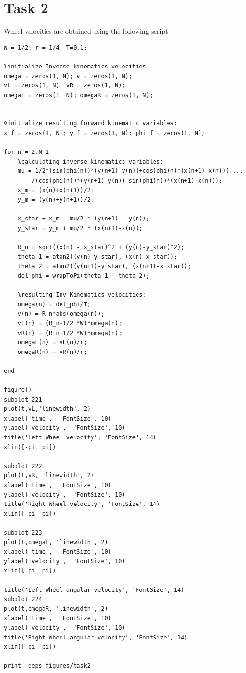 \documentclass[12pt,letterpaper]{article}
\begin{document}
\section*{Task 2}
Wheel velocities are obtained using the following script: 
\begin{lstlisting}
W = 1/2; r = 1/4; T=0.1; 

%initialize Inverse kinematics velocities
omega = zeros(1, N); v = zeros(1, N); 
vL = zeros(1, N); vR = zeros(1, N); 
omegaL = zeros(1, N); omegaR = zeros(1, N); 


%initialize resulting forward kinematic variables: 
x_f = zeros(1, N); y_f = zeros(1, N); phi_f = zeros(1, N); 

for n = 2:N-1
    %calculating inverse kinematics variables: 
    mu = 1/2*(sin(phi(n))*(y(n+1)-y(n))+cos(phi(n)*(x(n+1)-x(n))))...
        /(cos(phi(n))*(y(n+1)-y(n))-sin(phi(n))*(x(n+1)-x(n))); 
    x_m = (x(n)+x(n+1))/2; 
    y_m = (y(n)+y(n+1))/2; 
    
    x_star = x_m - mu/2 * (y(n+1) - y(n)); 
    y_star = y_m + mu/2 * (x(n+1)-x(n)); 
    
    R_n = sqrt((x(n) - x_star)^2 + (y(n)-y_star)^2); 
    theta_1 = atan2((y(n)-y_star), (x(n)-x_star)); 
    theta_2 = atan2((y(n+1)-y_star), (x(n+1)-x_star)); 
    del_phi = wrapToPi(theta_1 - theta_2); 
    
    %resulting Inv-Kinematics velocities: 
    omega(n) = del_phi/T; 
    v(n) = R_n*abs(omega(n));  
    vL(n) = (R_n-1/2 *W)*omega(n); 
    vR(n) = (R_n+1/2 *W)*omega(n); 
    omegaL(n) = vL(n)/r; 
    omegaR(n) = vR(n)/r; 

end

figure()
subplot 221
plot(t,vL,'linewidth', 2)
xlabel('time',  'FontSize', 10)
ylabel('velocity',  'FontSize', 10)
title('Left Wheel velocity', 'FontSize', 14)
xlim([-pi  pi])

subplot 222
plot(t,vR, 'linewidth', 2)
xlabel('time',  'FontSize', 10)
ylabel('velocity',  'FontSize', 10)
title('Right Wheel velocity', 'FontSize', 14)
xlim([-pi  pi])

subplot 223
plot(t,omegaL, 'linewidth', 2)
xlabel('time',  'FontSize', 10)
ylabel('velocity',  'FontSize', 10)
xlim([-pi  pi])

title('Left Wheel angular velocity', 'FontSize', 14)
subplot 224
plot(t,omegaR, 'linewidth', 2)
xlabel('time',  'FontSize', 10)
ylabel('velocity',  'FontSize', 10)
title('Right Wheel angular velocity', 'FontSize', 14)
xlim([-pi  pi])

print -deps figures/task2
\end{lstlisting}
\end{document}
